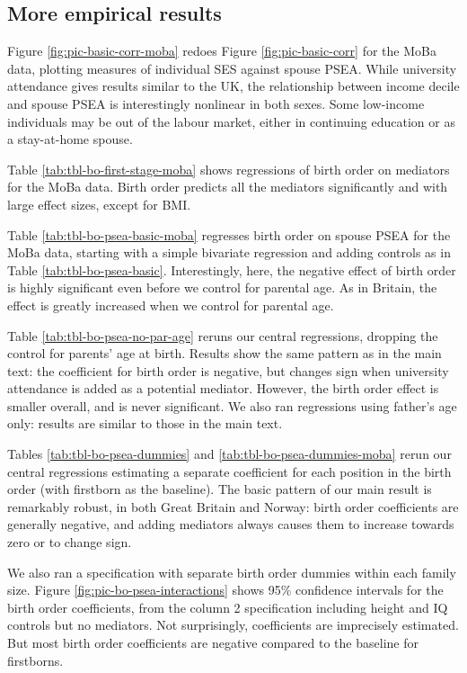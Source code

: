\documentclass[
  12pt,
]{article}
\theoremstyle{definition}
\theoremstyle{definition}
\theoremstyle{definition}
\theoremstyle{definition}
\theoremstyle{remark}
\begin{document}
\FloatBarrier

\newpage

\hypertarget{more-empirical-results}{%
\subsection{More empirical results}\label{more-empirical-results}}

Figure \ref{fig:pic-basic-corr-moba} redoes Figure \ref{fig:pic-basic-corr}
for the MoBa data, plotting measures of individual SES against spouse PSEA.
While university attendance gives results similar to the UK, the relationship
between income decile and spouse PSEA is interestingly nonlinear in both
sexes. Some low-income individuals may be out of the labour market,
either in continuing education or as a stay-at-home spouse.

Table \ref{tab:tbl-bo-first-stage-moba} shows regressions of birth order on
mediators for the MoBa data. Birth order predicts all the mediators significantly
and with large effect sizes, except for BMI.

Table \ref{tab:tbl-bo-psea-basic-moba} regresses birth order on spouse PSEA
for the MoBa data, starting with a simple bivariate regression and adding
controls as in Table \ref{tab:tbl-bo-psea-basic}. Interestingly, here,
the negative effect of birth order is highly significant even before we
control for parental age. As in Britain, the effect is greatly increased
when we control for parental age.

Table \ref{tab:tbl-bo-psea-no-par-age} reruns our central regressions,
dropping the control for parents' age at birth. Results show the same
pattern as in the main text: the coefficient for birth order is
negative, but changes sign when university attendance is added as a
potential mediator. However, the birth order effect is smaller overall,
and is never significant. We also ran regressions using father's age
only: results are similar to those in the main text.

Tables \ref{tab:tbl-bo-psea-dummies} and \ref{tab:tbl-bo-psea-dummies-moba}
rerun our central regressions estimating a separate coefficient for each position
in the birth order (with firstborn as the baseline). The basic pattern of our
main result is remarkably robust, in both Great Britain and Norway: birth order
coefficients are generally negative, and adding mediators always
causes them to increase towards zero or to change sign.

We also ran a specification with separate birth order dummies within
each family size. Figure \ref{fig:pic-bo-psea-interactions} shows 95\%
confidence intervals for the birth order coefficients, from the column 2
specification including height and IQ controls but no mediators. Not
surprisingly, coefficients are imprecisely estimated. But most birth
order coefficients are negative compared to the baseline for firstborns.
\end{document}
